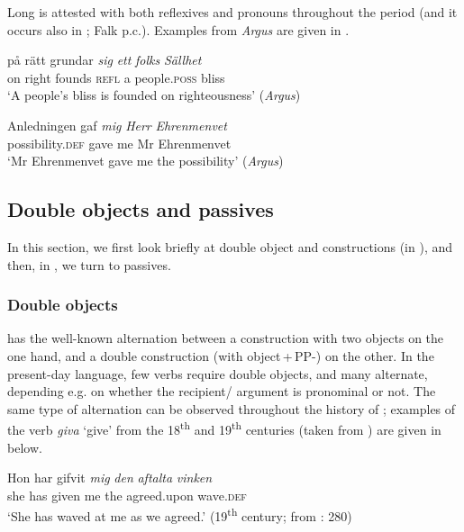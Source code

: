 \documentclass[output=paper]{langscibook}
\begin{document}
\z
\z


Long  is attested with both reflexives and pronouns throughout the  period (and it occurs also in ; Falk p.c.). Examples from \textit{Argus} are given in .


\ea \label{ex:intro:21}
\ea
\gll  på rätt   grundar \textit{sig} \textit{ett} \textit{folks} \textit{Sällhet} \\
    on right founds    \textsc{refl}   a   people\textsc{.poss}   bliss\\
    \glt `A people’s bliss is founded on righteousness’ (\textit{Argus})

\ex
\gll  Anledningen     gaf \textit{mig} \textit{Herr} \textit{Ehrenmenvet}  \\
       possibility.\textsc{def}  gave   me   Mr  Ehrenmenvet\\
    \glt `Mr Ehrenmenvet gave me the possibility’ (\textit{Argus})
\z
\z

\subsection{Double objects and passives}\label{sec:intro:3.3}


In this section, we first look briefly at double object and  constructions (in ), and then, in , we turn to passives.


\subsubsection{Double objects}\label{sec:intro:3.3.1}


 has the well-known alternation between a construction with two objects on the one hand, and a double  construction (with object\,+\,PP-) on the other. In the present-day language, few verbs require double objects, and many alternate, depending e.g. on whether the recipient/ argument is pronominal or not. The same type of alternation can be observed throughout the history of ; examples of the verb \textit{giva} ‘give’ from the 18\textsuperscript{th} and 19\textsuperscript{th} centuries (taken from \citealt{Valdeson2016}) are given in  below.


\ea \label{ex:intro:22}
\ea \label{ex:intro:22a}
\gll  Hon har gifvit \textit{mig} \textit{den} \textit{aftalta} \textit{vinken} \\      
     she   has given   me   the   agreed.upon  wave.\textsc{def}\\
     \glt ‘She has waved at me as we agreed.’ (19\textsuperscript{th} century; from \citealt{Valdeson2016}: 280) 
\end{document}
